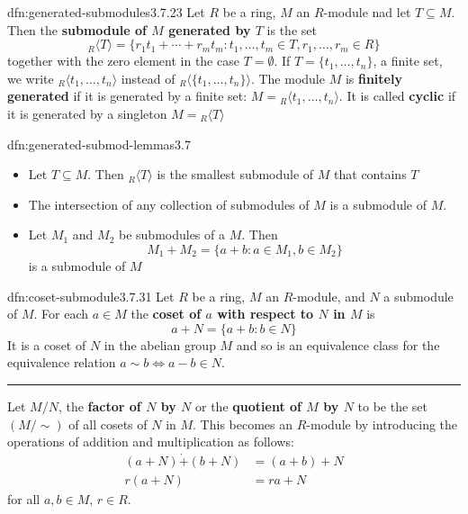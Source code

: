\documentclass[landscape, 8pt]{extarticle}
\begin{document}
\begin{multicols}{3}
\begin{dfn}{dfn:generated-submodules}{3.7.23}
    Let $R$ be a ring, $M$ an $R$-module nad let $T \subseteq M$. Then the \textbf{submodule of $M$ generated by $T$} is the set
    \[{}_{R}\langle T \rangle = \{r_{1}t_{1} +\cdots+ r_{m}t_{m} : t_{1},\dots,t_{m}\in T, r_{1},\dots,r_{m}\in R\}\]
together with the zero element in the case $T = \emptyset$. If $T = \{t_{1},\dots,t_{n}\}$, a finite set, we write ${}_{R}\langle t_{1},\dots,t_{n} \rangle$ instead of ${}_{R}\langle \{t_{1},\dots,t_{n}\} \rangle$. The module $M$ is \textbf{finitely generated} if it is generated by a finite set: $M = {}_{R}\langle t_{1},\dots,t_{n} \rangle$. It is called \textbf{cyclic} if it is generated by a singleton $M = {}_{R}\langle T\rangle$
\end{dfn}

\begin{dfn}{dfn:generated-submod-lemmas}{3.7}
    \begin{itemize}
        \setlength\itemsep{0em}
        \item[\textbf{3.7.28}] Let $T \subseteq M$. Then ${}_{R}\langle T \rangle$ is the smallest submodule of $M$ that contains $T$
        \item[\textbf{3.7.29}] The intersection of any collection of submodules of $M$ is a submodule of $M$.
        \item[\textbf{3.7.30}] Let $M_{1}$ and $M_{2}$ be submodules of a $M$. Then
            \[M_{1} + M_{2} = \{a + b : a\in M_{1}, b\in M_{2}\}\]
            is a submodule of $M$
    \end{itemize}
\end{dfn}

\begin{dfn}{dfn:coset-submodule}{3.7.31}
    Let $R$ be a ring, $M$ an $R$-module, and $N$ a submodule of $M$. For each $a\in M$ the \textbf{coset of $a$ with respect to $N$ in $M$} is
    \[a + N = \{ a + b : b\in N\}\]
    It is a coset of $N$ in the abelian group $M$ and so is an equivalence class for the equivalence relation $a \sim b \iff a - b \in N$.

    \noindent\rule{\textwidth}{0.2pt}
    Let $M / N$, the \textbf{factor of $N$ by $N$} or the \textbf{quotient of $M$ by $N$} to be the set $(M / \sim)$ of all cosets of $N$ in $M$. This becomes an $R$-module by introducing the operations of addition and multiplication as follows:
    \begin{align*}
        (a + N) \dot{+} (b + N) &= (a + b) + N\\
        r(a + N) &= ra + N
    \end{align*}
    for all $a,b\in M$, $r\in R$.


\end{dfn}
\end{multicols}
\end{document}

